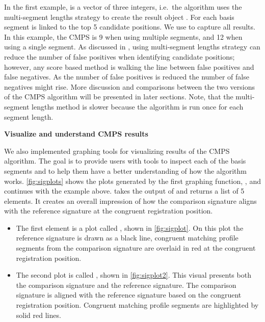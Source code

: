 In the first example,  is a vector of three integers,
i.e.~the algorithm uses the multi-segment lengths strategy to create the
result object . For
 each basis segment is linked to the
top 5 candidate positions. We use  to
capture all results. In this example, the CMPS is 9 when using multiple
segments, and 12 when using a single segment. As discussed in
\citet{cmps}, using multi-segment lengths strategy can reduce the number
of false positives when identifying candidate positions; however, any
score based method is walking the line between false positives and false
negatives. As the number of false positives is reduced the number of
false negatives might rise. More discussion and comparisons between the
two versions of the CMPS algorithm will be presented in later sections.
Note, that the multi-segment lengths method is slower because the
algorithm is run once for each segment length.

\textbf{Visualize and understand CMPS results}

We also implemented graphing tools for visualizing results of the CMPS
algorithm. The goal is to provide users with tools to inspect each of
the basis segments and to help them have a better understanding of how
the algorithm works. \autoref{fig:sigplots} shows the plots generated by
the first graphing function, , and
continues with the example above.  takes
the output of
 and returns
a list of 5 elements. It creates an overall impression of how the
comparison signature aligns with the reference signature at the
congruent registration position.

\begin{itemize}
\item
  The first element is a plot called , shown
  in \autoref{fig:sigplot}. On this plot the reference signature is
  drawn as a black line, congruent matching profile segments from the
  comparison signature are overlaid in red at the congruent registration
  position.
\item
  The second plot is called , shown in
  \autoref{fig:sigplot2}. This visual presents both the comparison
  signature and the reference signature. The comparison signature is
  aligned with the reference signature based on the congruent
  registration position. Congruent matching profile segments are
  highlighted by solid red lines.
\end{itemize}

